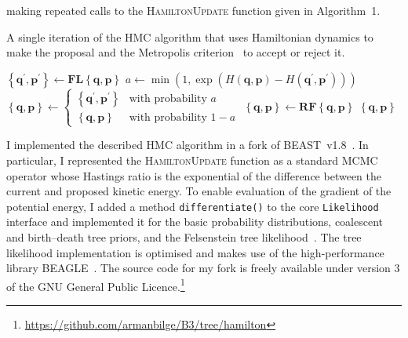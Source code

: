 \documentclass{article}
\renewcommand{\vec}[1]{\ensuremath{\boldsymbol{\mathbf{#1}}}}
\newcommand{\op}[1]{\ensuremath{\boldsymbol{\mathbf{#1}}}}
\begin{document}
        making repeated calls to the \textsc{HamiltonUpdate} function given in
        Algorithm~1.
    \begin{algorithm}
        \caption{A single iteration of the \acl{HMC} algorithm that uses
                 Hamiltonian dynamics to make the proposal and the Metropolis
                 criterion~\cite{Met+53} to accept or reject it.}
        \begin{algorithmic}[1]
        \Function {HamiltonUpdate}{$\left\{\vec{q},\vec{p}\right\}$}
            \State $\left\{\vec{q}^\prime, \vec{p}^\prime\right\}
                \leftarrow \op{F}\op{L}\left\{\vec{q},\vec{p}\right\}$
            \State $a \leftarrow \min\left(1,
                \exp\left(
                    H\left(\vec{q}, \vec{p}\right) - H\left(\vec{q}^\prime,
                        \vec{p}^\prime\right)\right)\right)$
            \State $\left\{\vec{q},\vec{p}\right\} \leftarrow
                \begin{cases}
                    \left\{\vec{q}^\prime, \vec{p}^\prime\right\}
                        & \text{with probability } a \\
                    \left\{\vec{q},\vec{p}\right\}
                        & \text{with probability } 1 - a
                \end{cases}$
            \State $\left\{\vec{q},\vec{p}\right\} \leftarrow
                        \op{R}\op{F}\left\{\vec{q},\vec{p}\right\}$
            \State \Return $\left\{\vec{q},\vec{p}\right\}$
        \EndFunction
        \end{algorithmic}
    \end{algorithm}

    I implemented the described \ac{HMC} algorithm in a fork of
        BEAST~v1.8~\cite{Dru+12}.
    In particular, I represented the \textsc{HamiltonUpdate} function as a
        standard \ac{MCMC} operator whose Hastings ratio is the exponential of
        the difference between the current and proposed kinetic energy.
    To enable evaluation of the gradient of the potential energy, I added a
        method \texttt{differentiate()} to the core \texttt{Likelihood}
        interface and implemented it for the basic probability distributions,
        coalescent and birth--death tree priors, and the Felsenstein tree
        likelihood~\cite{Fel81}.
    The tree likelihood implementation is optimised and makes use of the
        high-performance library BEAGLE~\cite{Ayr+12}.
    The source code for my fork is freely available under version 3 of the GNU
        General Public
        Licence.\footnote{\url{https://github.com/armanbilge/B3/tree/hamilton}}
\end{document}
